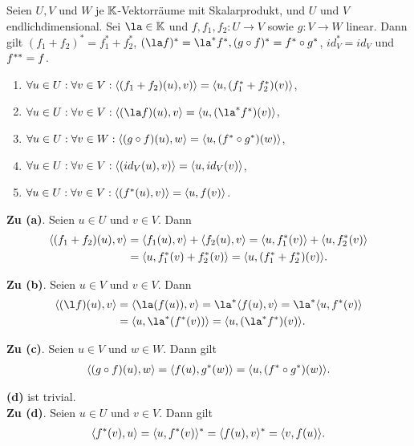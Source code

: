 \documentclass[../../main.tex]{subfiles}
\begin{document}
\begin{pro}\label{15.1.10}
Seien $U,V$ und $W$ je $\mathbb K$-Vektorräume mit Skalarprodukt, und $U$ und $V$ endlichdimensional. Sei $\la\in \K$ und $f,f_1,f_2: U\to V$ sowie $g: V\to W$ linear. Dann gilt $(f_1+f_2)^*=f_1^*+f_2^*$, $(\la f)^*=\la^*f^*, (g\circ f)^*=f^*\circ g^*$, $id_V^*=id_V$ und $f^{**}=f$.
\end{pro}
\begin{cproof}
\begin{enumerate}[\normalfont(a)]
Zu zeigen ist:
\item $\forall u\in U: \forall v\in V: \langle (f_1+f_2)(u),v)\rangle=\langle u,(f_1^*+f_2^*)(v)\rangle$,
\item $\forall u\in U: \forall v\in V: \scal{(\la f)(u),v}=\scal{u,(\la^* f^*)(v)}$,
\item $\forall u\in U: \forall v\in W: \langle (g\circ f)(u),w\rangle=\langle u,(f^*\circ g^*)(w)\rangle$,
\item $\forall u\in U: \forall v\in V: \langle (id_V(u),v)\rangle=\langle u,id_V(v)\rangle$,
\item $\forall u\in U: \forall v\in V: \langle (f^*(u),v)\rangle=\langle u,f(v)\rangle$.
\end{enumerate}

\noindent\textbf{Zu (a)}. Seien $u\in U$ und $v\in V$. Dann 
\begin{align*}
\langle (f_1+f_2)(u),v\rangle&=\langle f_1(u),v\rangle+\langle f_2(u),v\rangle=\langle u,f_1^*(v)\rangle+\langle u,f_2^*(v)\rangle\\
&=\langle u,f_1^*(v)+f_2^*(v)\rangle=\langle u,(f_1^*+f_2^*)(v)\rangle.
\end{align*}

\noindent\textbf{Zu (b)}. Seien $u\in V$ und $v\in V$. Dann\begin{align*}
\scal{(\l f)(u), v}&=\scal{\la(f(u)), v}=\la^*\scal{f(u),v}=\la^*\scal{u,f^*(v)}\\
&=\scal{u,\la^*(f^*(v))}=\scal{u,(\la^*f^*)(v)}.
\end{align*}

\noindent\textbf{Zu (c)}. Seien $u\in V$ und $w\in W$. Dann gilt
\begin{align*}
\langle (g\circ f)(u),w\rangle=\langle f(u),g^*(w)\rangle=\langle u,(f^*\circ g^*)(w)\rangle.
\end{align*}

\noindent\textbf{(d)} ist trivial.\\

\noindent\textbf{Zu (d)}. Seien $u\in U$ und $v\in V$. Dann gilt
\begin{align*}
\langle f^*(v),u\rangle=\langle u,f^*(v)\rangle^*=\langle f(u),v\rangle^*=\langle v,f(u)\rangle.
\end{align*}
\end{cproof}
\end{document}

